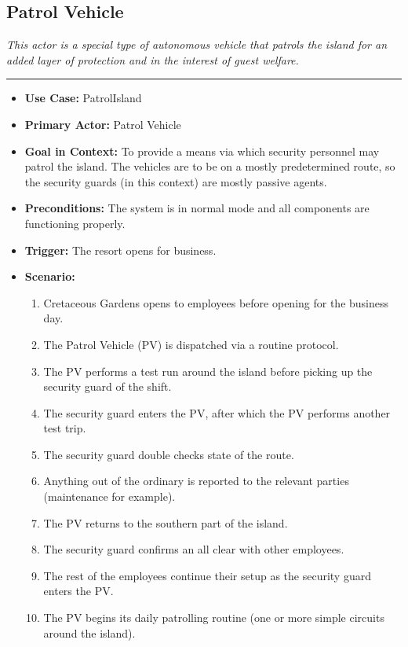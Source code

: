 \documentclass[12pt]{article}
\begin{document}
    \subsection{Patrol Vehicle}
    \textit{This actor is a special type of autonomous vehicle that patrols the island for an 
    added layer of protection and in the interest of guest welfare.}
    \par\noindent\rule{\textwidth}{0.4pt}    
    \begin{itemize}
        \item[]\textbf{Use Case:}                                
            PatrolIsland

        \item[]\textbf{Primary Actor:}
            Patrol Vehicle

        \item[]\textbf{Goal in Context:}
            To provide a means via which security personnel may patrol the island. The vehicles
            are to be on a mostly predetermined route, so the security guards (in this context)
            are mostly passive agents.

        \item[]\textbf{Preconditions:}
            The system is in normal mode and all components are functioning properly.

        \item[]\textbf{Trigger:}
            The resort opens for business.

        \item[]\textbf{Scenario:}
            \begin{enumerate}
                \item Cretaceous Gardens opens to employees before opening for the business day.
                \item The Patrol Vehicle (PV) is dispatched via a routine protocol.
                \item The PV performs a test run around the island before picking up the security guard
                of the shift.
                \item The security guard enters the PV, after which the PV performs another test trip.
                \item The security guard double checks state of the route.
                \item Anything out of the ordinary is reported to the relevant parties (maintenance for example).
                \item The PV returns to the southern part of the island.
                \item The security guard confirms an all clear with other employees.
                \item The rest of the employees continue their setup as the security guard enters the PV.
                \item The PV begins its daily patrolling routine (one or more simple circuits around the island).
            \end{enumerate}


\end{itemize}
\end{document}
